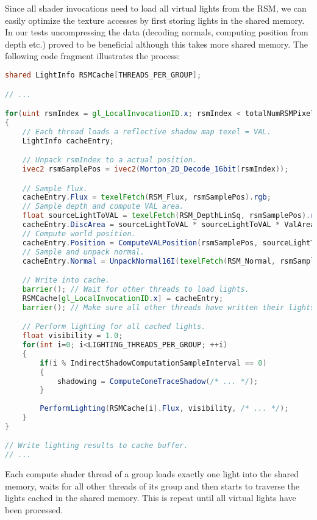 \documentclass[thesis.tex]{subfiles}
\begin{document}
Since all shader invocations need to load all virtual lights from the RSM, we can easily optimize the texture accesses by first storing lights in the shared memory.
In our tests uncompressing the data (decoding normals, computing position from depth etc.) proved to be beneficial although this takes more shared memory.
The following code fragment illustrates the process:
\begin{lstlisting}[language=GLSL]
shared LightInfo RSMCache[THREADS_PER_GROUP];

// ...

for(uint rsmIndex = gl_LocalInvocationID.x; rsmIndex < totalNumRSMPixels; rsmIndex += THREADS_PER_GROUP)
{
	// Each thread loads a reflective shadow map texel = VAL.
	LightInfo cacheEntry;

	// Unpack rsmIndex to a actual position.
	ivec2 rsmSamplePos = ivec2(Morton_2D_Decode_16bit(rsmIndex)); 

	// Sample flux.
	cacheEntry.Flux = texelFetch(RSM_Flux, rsmSamplePos).rgb;
	// Sample depth and compute VAL area.
	float sourceLightToVAL = texelFetch(RSM_DepthLinSq, rsmSamplePos).r;
	cacheEntry.DiscArea = sourceLightToVAL * sourceLightToVAL * ValAreaFactor;
	// Compute world position.
	cacheEntry.Position = ComputeVALPosition(rsmSamplePos, sourceLightToVAL);
	// Sample and unpack normal.
	cacheEntry.Normal = UnpackNormal16I(texelFetch(RSM_Normal, rsmSamplePos).xy);

	// Write into cache.
	barrier(); // Wait for other threads to load lights.
 	RSMCache[gl_LocalInvocationID.x] = cacheEntry;
	barrier(); // Make sure all other threads have written their lights.

	// Perform lighting for all cached lights.
	float visibility = 1.0;
	for(int i=0; i<LIGHTING_THREADS_PER_GROUP; ++i)
	{
		if(i % IndirectShadowComputationSampleInterval == 0)
		{
			shadowing = ComputeConeTraceShadow(/* ... */);
		}
		
		PerformLighting(RSMCache[i].Flux, visibility, /* ... */);
	}
}

// Write lighting results to cache buffer.
// ...
\end{lstlisting}
Each compute shader thread of a group loads exactly one light into the shared memory, waits for all other threads of its group and then starts to traverse the lights cached in the shared memory.
This is repeat until all virtual lights have been processed.
\end{document}
